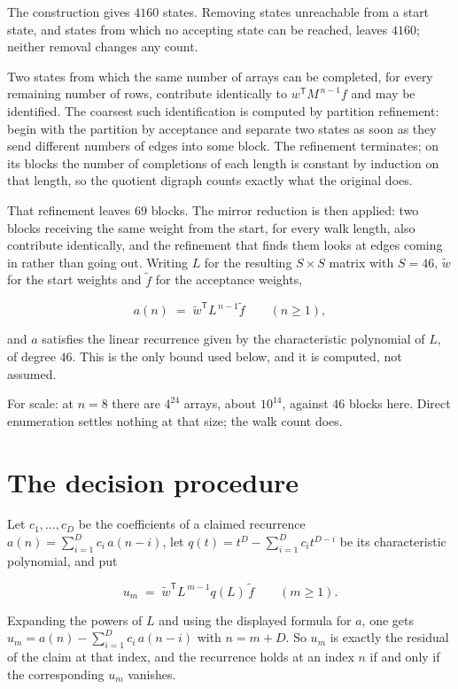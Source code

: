 \documentclass[11pt]{article}
\theoremstyle{definition}
\begin{document}
The construction gives $4160$ states. Removing states unreachable from a start state, and states from which no accepting state can be reached, leaves $4160$; neither removal changes any count.

Two states from which the same number of arrays can be completed, for every remaining number of rows, contribute identically to $w^{\mathsf T}M^{\,n-1}f$ and may be identified. The coarsest such identification is computed by partition refinement: begin with the partition by acceptance and separate two states as soon as they send different numbers of edges into some block. The refinement terminates; on its blocks the number of completions of each length is constant by induction on that length, so the quotient digraph counts exactly what the original does.

That refinement leaves $69$ blocks. The mirror reduction is then applied: two blocks receiving the same weight from the start, for every walk length, also contribute identically, and the refinement that finds them looks at edges coming in rather than going out. Writing $L$ for the resulting $S \times S$ matrix with $S = 46$, $\tilde w$ for the start weights and $\tilde f$ for the acceptance weights,

\[a(n) \;=\; \tilde w^{\mathsf T} L^{\,n-1} \tilde f \qquad (n \ge 1),\]

and $a$ satisfies the linear recurrence given by the characteristic polynomial of $L$, of degree $46$. This is the only bound used below, and it is computed, not assumed.

For scale: at $n = 8$ there are $4^{24}$ arrays, about $10^{14}$, against $46$ blocks here. Direct enumeration settles nothing at that size; the walk count does.

\section{The decision procedure}

Let $c_1,\dots,c_D$ be the coefficients of a claimed recurrence $a(n) = \sum_{i=1}^{D} c_i\,a(n-i)$, let $q(t) = t^{D} - \sum_{i=1}^{D} c_i t^{D-i}$ be its characteristic polynomial, and put

\[u_m \;=\; \tilde w^{\mathsf T} L^{\,m-1} q(L)\,\tilde f \qquad (m \ge 1).\]

Expanding the powers of $L$ and using the displayed formula for $a$, one gets $u_m = a(n) - \sum_{i=1}^{D} c_i\,a(n-i)$ with $n = m + D$. So $u_m$ is exactly the residual of the claim at that index, and the recurrence holds at an index $n$ if and only if the corresponding $u_m$ vanishes.
\end{document}
